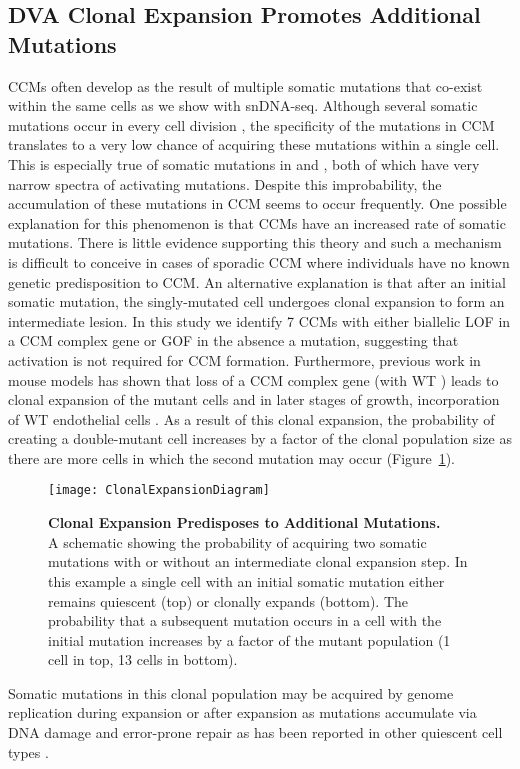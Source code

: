 \subsection{DVA Clonal Expansion Promotes Additional Mutations}
CCMs often develop as the result of multiple somatic mutations that co-exist within the same cells as we show with snDNA-seq. Although several somatic mutations occur in every cell division \citep{rodin2021}, the specificity of the mutations in CCM translates to a very low chance of acquiring these mutations within a single cell. This is especially true of somatic mutations in  and , both of which have very narrow spectra of activating mutations. Despite this improbability, the accumulation of these mutations in CCM seems to occur frequently. One possible explanation for this phenomenon is that CCMs have an increased rate of somatic mutations. There is little evidence supporting this theory and such a mechanism is difficult to conceive in cases of sporadic CCM where individuals have no known genetic predisposition to CCM. An alternative explanation is that after an initial somatic mutation, the singly-mutated cell undergoes clonal expansion to form an intermediate lesion. In this study we identify 7 CCMs with either biallelic LOF in a CCM complex gene or  GOF in the absence a  mutation, suggesting that  activation is not required for CCM formation. Furthermore, previous work in mouse models has shown that loss of a CCM complex gene (with WT ) leads to clonal expansion of the mutant cells and in later stages of growth, incorporation of WT endothelial cells \citep{detter2018, malinverno2019}. As a result of this clonal expansion, the probability of creating a double-mutant cell increases by a factor of the clonal population size as there are more cells in which the second mutation may occur (Figure~\ref{ClonalExpansionDiagram}). 
\begin{figure}[b!]
\centering
\texttt{[image: ClonalExpansionDiagram]}
\caption[Clonal Expansion Predisposes to Additional Mutations]{\textbf{Clonal Expansion Predisposes to Additional Mutations. \\} A schematic showing the probability of acquiring two somatic mutations with or without an intermediate clonal expansion step. In this example a single cell with an initial somatic mutation either remains quiescent (top) or clonally expands (bottom). The probability that a subsequent mutation occurs in a cell with the initial mutation increases by a factor of the mutant population (1 cell in top, 13 cells in bottom).}

\label{ClonalExpansionDiagram}
\end{figure}
Somatic mutations in this clonal population may be acquired by genome replication during expansion or after expansion as mutations accumulate via DNA damage and error-prone repair as has been reported in other quiescent cell types \citep{lodato2018}. 

